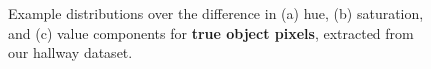 \begin{frame}
\begin{figure}
        \caption{Example distributions over the difference in (a) hue, (b)
            saturation, and (c) value components for {\bf true object pixels},
            extracted from our hallway dataset.}
        \label{fig:foreground-distribution}
    \end{figure}

    \vspace{-0.3in}
    

\end{frame}
